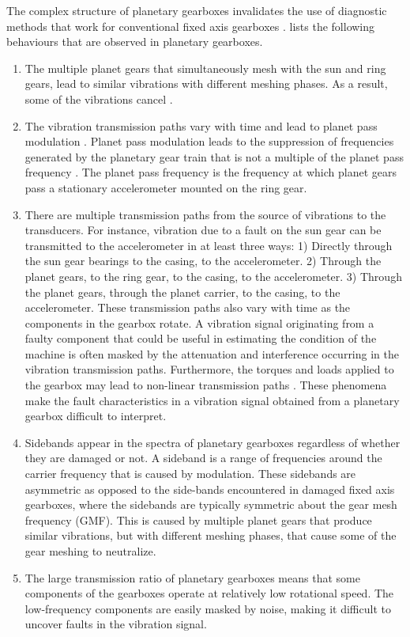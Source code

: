 The complex structure of planetary gearboxes invalidates the use of diagnostic methods that work for conventional fixed axis gearboxes \cite{Lei2014}. \cite{Lei2014} lists the following behaviours that are observed in planetary gearboxes.  

\begin{enumerate}
	\item  The multiple planet gears that simultaneously mesh with the sun and ring gears, lead to similar vibrations with different meshing phases. As a result, some of the vibrations cancel \citep{Blunt2006}.
	
	\item  The vibration transmission paths vary with time and lead to planet pass modulation \citep{Blunt2006}. Planet pass modulation leads to the suppression of frequencies generated by the planetary gear train that is not a multiple of the planet pass frequency \citep{McFadden1985}. The planet pass frequency is the frequency at which planet gears pass a stationary accelerometer mounted on the ring gear. 
	
	\item There are multiple transmission paths from the source of vibrations to the transducers. For instance, vibration due to a fault on the sun gear can be transmitted to the accelerometer in at least three ways: 1) Directly through the sun gear bearings to the casing, to the accelerometer. 2) Through the planet gears, to the ring gear, to the casing, to the accelerometer. 3) Through the planet gears, through the planet carrier, to the casing, to the accelerometer. These transmission paths also vary with time as the components in the gearbox rotate. A vibration signal originating from a faulty component that could be useful in estimating the condition of the machine is often masked by the attenuation and interference occurring in the vibration transmission paths. Furthermore, the torques and loads applied to the gearbox may lead to non-linear transmission paths \cite{Blunt2006}. These phenomena make the fault characteristics in a vibration signal obtained from a planetary gearbox difficult to interpret.
	
	\item Sidebands appear in the spectra of planetary gearboxes regardless of whether they are damaged or not. A sideband is a range of frequencies around the carrier frequency that is caused by modulation. These sidebands are asymmetric as opposed to the side-bands encountered in damaged fixed axis gearboxes, where the sidebands are typically symmetric about the gear mesh frequency (GMF). This is caused by multiple planet gears that produce similar vibrations, but with different meshing phases, that cause some of the gear meshing to neutralize. 
	
	\item The large transmission ratio of planetary gearboxes means that some components of the gearboxes operate at relatively low rotational speed. The low-frequency components are easily masked by noise, making it difficult to uncover faults in the vibration signal.
\end{enumerate}

